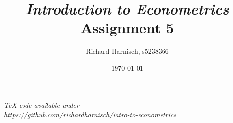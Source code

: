 \documentclass[a4paper]{article}
\begin{document}
\title{\textit{Introduction to Econometrics}\\Assignment 5}
\author{Richard Harnisch, s5238366}
\date{\today}
\maketitle

\makeatletter
\newcommand{\answer}[1]{%
    \par\medskip
    \noindent
    \hspace*{-\@totalleftmargin}%
    \fbox{%
        \parbox{\dimexpr\textwidth-2\fboxsep-2\fboxrule}{#1}%
    }%
    \par\medskip
}
\makeatother

\noindent\textit{TeX code available under\\ \url{https://github.com/richardharnisch/intro-to-econometrics}}
\end{document}
